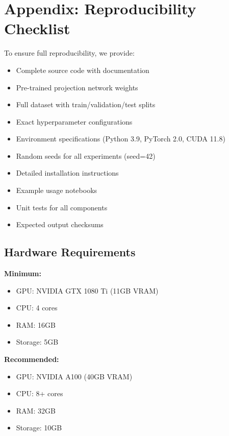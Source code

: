 \documentclass[11pt]{article}
\begin{document}
\section{Appendix: Reproducibility Checklist}
\label{app:reproducibility}

To ensure full reproducibility, we provide:

\begin{itemize}[leftmargin=*]
    \item[\checkmark] Complete source code with documentation
    \item[\checkmark] Pre-trained projection network weights
    \item[\checkmark] Full dataset with train/validation/test splits
    \item[\checkmark] Exact hyperparameter configurations
    \item[\checkmark] Environment specifications (Python 3.9, PyTorch 2.0, CUDA 11.8)
    \item[\checkmark] Random seeds for all experiments (seed=42)
    \item[\checkmark] Detailed installation instructions
    \item[\checkmark] Example usage notebooks
    \item[\checkmark] Unit tests for all components
    \item[\checkmark] Expected output checksums
\end{itemize}

\subsection{Hardware Requirements}

\textbf{Minimum:}
\begin{itemize}[leftmargin=*]
    \item GPU: NVIDIA GTX 1080 Ti (11GB VRAM)
    \item CPU: 4 cores
    \item RAM: 16GB
    \item Storage: 5GB
\end{itemize}

\textbf{Recommended:}
\begin{itemize}[leftmargin=*]
    \item GPU: NVIDIA A100 (40GB VRAM)
    \item CPU: 8+ cores
    \item RAM: 32GB
    \item Storage: 10GB
\end{itemize}
\end{document}
